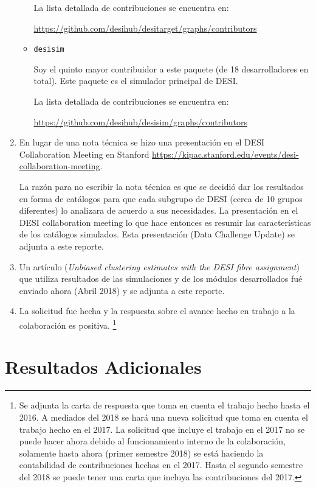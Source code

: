 \documentclass[12pt,spanish]{article}
\begin{document}
\begin{enumerate}
\begin{itemize}
La lista detallada de contribuciones se encuentra en:

\url{https://github.com/desihub/desitarget/graphs/contributors}

\item \texttt{desisim}

Soy el quinto mayor contribuidor a este paquete (de 18 desarrolladores
en total). Este paquete es el simulador principal de DESI.

La lista detallada de contribuciones se encuentra en:

\url{https://github.com/desihub/desisim/graphs/contributors}

\end{itemize}
\item En lugar de una nota t\'ecnica se hizo una presentaci\'on en el
  DESI Collaboration Meeting en Stanford
  \url{https://kipac.stanford.edu/events/desi-collaboration-meeting}. 

  La raz\'on para no escribir la nota t\'ecnica es que se decidi\'o
  dar los resultados en forma de cat\'alogos para que cada subgrupo de
  DESI (cerca de 10 grupos diferentes) lo analizara de acuerdo a sus
  necesidades. 
  La presentaci\'on en el DESI collaboration meeting lo que hace
  entonces es resumir las caracter\'isticas de los cat\'alogos
  simulados. 
  Esta presentaci\'on (Data Challenge Update) se adjunta a este reporte.
\item Un art\'iculo (\emph{Unbiased clustering estimates with the DESI
fibre assignment}) que utiliza resultados de las simulaciones y de
  los m\'odulos desarrollados fu\'e enviado ahora (Abril 2018) y se
  adjunta a este reporte. 

\item La solicitud fue hecha y la respuesta sobre el avance hecho en
  trabajo a la colaboraci\'on es positiva. \footnote{Se adjunta la carta de
  respuesta que toma en cuenta el trabajo hecho hasta el 2016. 
  A mediados del 2018 se har\'a una nueva solicitud que
  toma en cuenta el trabajo hecho en el 2017. 
  La solicitud que incluye el trabajo en el 2017 no se puede hacer ahora debido al funcionamiento
  interno de la colaboraci\'on, solamente hasta ahora (primer
  semestre 2018) se est\'a haciendo la contabilidad de contribuciones
  hechas en el 2017. Hasta el segundo semestre del 2018 se puede tener
  una carta que incluya las contribuciones del 2017.}
\end{enumerate}


\section*{Resultados Adicionales}
\end{document}
